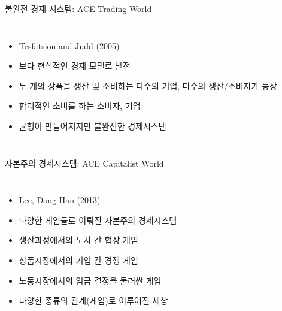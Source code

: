 \documentclass[final]{beamer}
\begin{document}
\begin{frame}[t]{불완전 경제 시스템: ACE Trading World}
	\begin{columns}[c]
	\column{18em}
	\begin{itemize}
		\item Tesfatsion and Judd (2005)
		\item 보다 현실적인 경제 모델로 발전
		\item 두 개의 상품을 생산 및 소비하는 다수의 기업, 다수의 생산/소비자가 등장
		\item 합리적인 소비를 하는 소비자, 기업
		\item 균형이 만들어지지만 불완전한 경제시스템
	\end{itemize}
	\column{12em}
	\end{columns}
\end{frame}

\begin{frame}[t]{자본주의 경제시스템: ACE Capitalist World}
	\begin{columns}[c]
	\column{18em}
	\begin{itemize}
		\item Lee, Dong-Han (2013)
		\item 다양한 게임들로 이뤄진 자본주의 경제시스템
		\item 생산과정에서의 노사 간 협상 게임
		\item 상품시장에서의 기업 간 경쟁 게임 
		\item 노동시장에서의 임금 결정을 둘러싼 게임
		\item 다양한 종류의 관계(게임)로 이루어진 세상 
	\end{itemize}
	\column{12em}
	\end{columns}
\end{frame}
\end{document}
